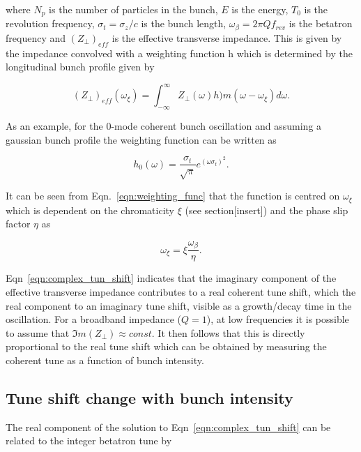 where $N_{p}$ is the number of particles in the bunch, $E$ is the energy, $T_{0}$ is the revolution frequency, $\sigma_{t} = \sigma_{z}/c$ is the bunch length, $\omega_{\beta} = 2\pi{}Q f_{rev}$ is the betatron frequency and $\left( Z_{\perp} \right)_{eff}$ is the effective transverse impedance. This is given by the impedance convolved with a weighting function h which is determined by the longitudinal bunch profile given by

\begin{equation}
\left( Z_{\perp} \right)_{eff} \left( \omega_{\xi} \right) = \int_{-\infty}^{\infty} Z_{\perp} \left( \omega \right) h){m} \left(  \omega - \omega_{\xi} \right) d\omega.
\end{equation}

As an example, for the 0-mode coherent bunch oscillation and assuming a gaussian bunch profile the weighting function can be written as

\begin{equation}
h_{0} \left( \omega \right) = \frac{\sigma_{t}}{\sqrt{\pi}}e^{ \left(  \omega \sigma_{t}  \right)^{2}}.
\label{eqn:weighting_func}
\end{equation}

It can be seen from Eqn.~\ref{eqn:weighting_func} that the function is centred on $\omega_{\xi}$ which is dependent on the chromaticity $\xi$ (see section[insert]) and the phase slip factor $\eta$ as

\begin{equation}
\omega_{\xi} = \xi \frac{\omega_{\beta}}{\eta}.
\end{equation}

Eqn~\ref{eqn:complex_tun_shift} indicates that the imaginary component of the effective transverse impedance contributes to a real coherent tune shift, which the real component to an imaginary tune shift, visible as a growth/decay time in the oscillation. For a broadband impedance ($Q=1$), at low frequencies it is possible to assume that $\Im{}m\left(  Z_{\perp} \right) \approx const.$ It then follows that this is directly proportional to the real tune shift which can be obtained by measuring the coherent tune as a function of bunch intensity.

\subsection{Tune shift change with bunch intensity}

The real component of the solution to Eqn~\ref{eqn:complex_tun_shift} can be related to the integer betatron tune by

